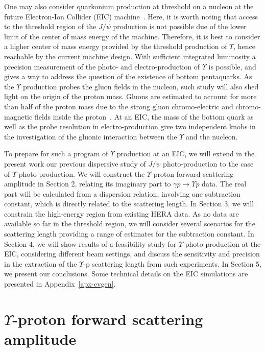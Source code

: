 \documentclass[prd,amsmath,%
twocolumn,floatfix,amssymb, preprintnumbers, linenumbers,nofootinbib, superscriptaddress]{revtex4}
\begin{document}
One may also consider quarkonium production at threshold on a nucleon at the future Electron-Ion Collider (EIC) 
machine~\cite{Accardi:2012qut}. Here, it is worth noting that access to the threshold region of the $J/\psi$ production is not possible due of the lower limit of the center of mass energy of the machine. Therefore, it is best to consider a higher center of mass energy provided by the threshold production of $\Upsilon$, hence reachable by the current machine design. With sufficient integrated luminosity a precision measurement of the photo- and electro-production of $\Upsilon$ is possible, and gives a way to address the question of the existence of bottom pentaquarks. As the $\Upsilon$ production probes the gluon fields in the nucleon, such study will also shed light on the origin of the proton mass. Gluons are estimated to account for more than half of the proton mass due to the strong gluon chromo-electric and chromo-magnetic fields inside the proton~\cite{Ji:1994av}. 
At an EIC, the mass of the bottom quark as well as  the probe resolution in electro-production give two independent knobs in the investigation of the gluonic interaction between the $\Upsilon$ and the nucleon.  

To prepare for such a program of $\Upsilon$ production at an EIC, we will extend in the present work our previous dispersive study of $J/\psi$ photo-production to the case of $\Upsilon$ photo-production. We will construct the $\Upsilon$-proton forward scattering amplitude in Section 2, relating  
its imaginary part to $\gamma p \to \Upsilon p$ data. The real part will be calculated from a dispersion relation, involving one subtraction constant, which is directly related to the scattering length. 
In Section 3, we will constrain the high-energy region from existing HERA data. As no data are available so far in the threshold region, we will consider several scenarios for the scattering length providing a range of estimates for the subtraction constant. 
In Section 4, we will show results of a feasibility study for $\Upsilon$ photo-production at the EIC, considering different beam settings, and discuss the sensitivity and precision in the extraction of the 
$\Upsilon$-p scattering length from such experiments. 
In Section 5, we present our conclusions. Some technical details on the EIC simulations are presented in Appendix~\ref{apx-evgen}. 

\section{$\Upsilon$-proton forward scattering amplitude}
\end{document}
